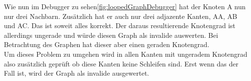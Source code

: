 Wie nun im Debugger zu sehen\ref{fig:loopedGraphDebugger} hat der Knoten A nun nur drei Nachbarn. Zusätzlich hat er auch nur drei adjazente Kanten, AA, AB und AC. Das ist soweit alles korrekt. Der daraus resultierende Knotengrad ist allerdings ungerade und würde diesen Graph als invalide auswerten. Bei Betrachtung des Graphen hat dieser aber einen geraden Knotengrad.\\
Um dieses Problem zu umgehen wird in allen Kanten mit ungeradem Knotengrad also zusätzlich geprüft ob diese Kanten keine Schleifen sind. Erst wenn das der Fall ist, wird der Graph als invalide ausgewertet.